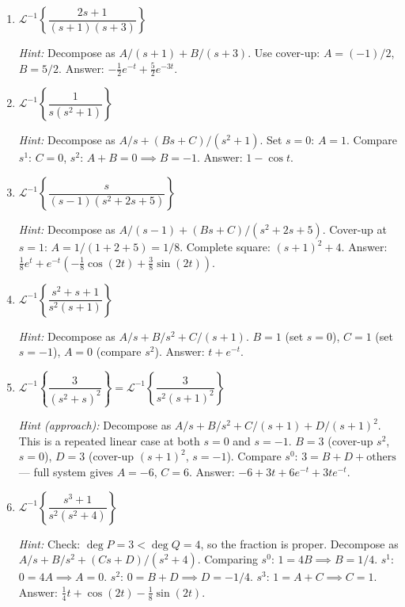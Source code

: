 \documentclass[12pt,a4paper]{article}
\begin{document}
\begin{enumerate}[label=\textbf{P\arabic*.}, leftmargin=*, itemsep=0.7em]

\item $\mathcal{L}^{-1}\!\left\{\dfrac{2s+1}{(s+1)(s+3)}\right\}$

  \textit{Hint:} Decompose as $A/(s+1)+B/(s+3)$. Use cover-up: $A=(-1)/2$,
  $B=5/2$. Answer: $-\tfrac{1}{2}e^{-t}+\tfrac{5}{2}e^{-3t}$.

\item $\mathcal{L}^{-1}\!\left\{\dfrac{1}{s(s^2+1)}\right\}$

  \textit{Hint:} Decompose as $A/s+(Bs+C)/(s^2+1)$. Set $s=0$: $A=1$.
  Compare $s^1$: $C=0$, $s^2$: $A+B=0\implies B=-1$.
  Answer: $1-\cos t$.

\item $\mathcal{L}^{-1}\!\left\{\dfrac{s}{(s-1)(s^2+2s+5)}\right\}$

  \textit{Hint:} Decompose as $A/(s-1)+(Bs+C)/(s^2+2s+5)$.
  Cover-up at $s=1$: $A=1/(1+2+5)=1/8$.
  Complete square: $(s+1)^2+4$.
  Answer: $\tfrac{1}{8}e^{t}+e^{-t}\!\left(-\tfrac{1}{8}\cos(2t)
  +\tfrac{3}{8}\sin(2t)\right)$.

\item $\mathcal{L}^{-1}\!\left\{\dfrac{s^2+s+1}{s^2(s+1)}\right\}$

  \textit{Hint:} Decompose as $A/s+B/s^2+C/(s+1)$.
  $B=1$ (set $s=0$), $C=1$ (set $s=-1$), $A=0$ (compare $s^2$).
  Answer: $t+e^{-t}$.

\item $\mathcal{L}^{-1}\!\left\{\dfrac{3}{(s^2+s)^2}\right\}
  = \mathcal{L}^{-1}\!\left\{\dfrac{3}{s^2(s+1)^2}\right\}$

  \textit{Hint (approach):} Decompose as $A/s+B/s^2+C/(s+1)+D/(s+1)^2$.
  This is a repeated linear case at both $s=0$ and $s=-1$.
  $B=3$ (cover-up $s^2$, $s=0$), $D=3$ (cover-up $(s+1)^2$, $s=-1$).
  Compare $s^0$: $3=B+D+\text{others}$ --- full system gives $A=-6$, $C=6$.
  Answer: $-6+3t+6e^{-t}+3te^{-t}$.

\item $\mathcal{L}^{-1}\!\left\{\dfrac{s^3+1}{s^2(s^2+4)}\right\}$

  \textit{Hint:} Check: $\deg P = 3 < \deg Q = 4$,
  so the fraction is proper. Decompose as $A/s+B/s^2+(Cs+D)/(s^2+4)$.
  Comparing $s^0$: $1=4B\implies B=1/4$. $s^1$: $0=4A\implies A=0$.
  $s^2$: $0=B+D\implies D=-1/4$. $s^3$: $1=A+C\implies C=1$.
  Answer: $\tfrac{1}{4}t+\cos(2t)-\tfrac{1}{8}\sin(2t)$.

\end{enumerate}
\end{document}
